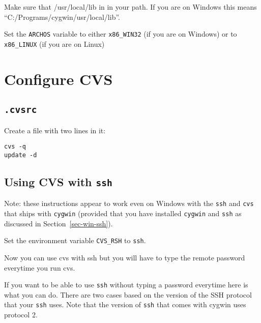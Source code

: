 \documentclass{article}
\def\t#1{{\tt #1}}
\begin{document}
 Make sure that /usr/local/lib in in your path. If you are on Windows this
 means ``C:/Programs/cygwin/usr/local/lib''. 

 Set the \t{ARCHOS} variable to either \t{x86\_WIN32} (if you are on Windows)
 or to \t{x86\_LINUX} (if you are on Linux)


\section{Configure CVS}

 \subsection{\t{.cvsrc}}

 Create a  file with two lines in it: 
\begin{verbatim}
cvs -q
update -d
\end{verbatim}

 \subsection{Using CVS with \t{ssh}}

 Note: these instructions appear to work even on Windows with the \t{ssh} and
\t{cvs} that ships with \t{cygwin} (provided that you have installed
\t{cygwin} and \t{ssh} as discussed in Section~\ref{sec-win-ssh}).

 Set the environment variable \t{CVS\_RSH} to \t{ssh}. 

 Now you can use cvs with ssh but you will have to type the remote password
 everytime you run cvs. 

 If you want to be able to use \t{ssh} without typing a password everytime
here is what you can do. There are two cases based on the version of the SSH
protocol that your \t{ssh} uses. Note that the version of \t{ssh} that comes
with cygwin uses protocol 2.  
\end{document}
